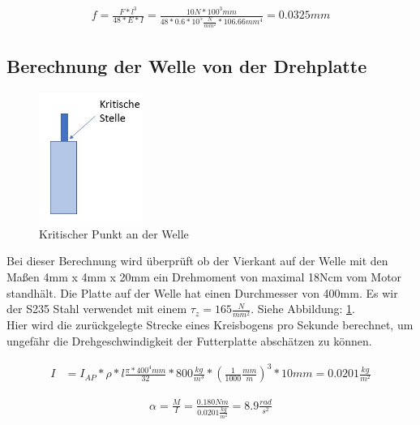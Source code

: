 \begin{align*}
f=\frac{ F*l^{ 3 } }{ 48*E*I} = \frac{10N*100^{3}mm}{48*0.6*10^{5}\frac{N}{mm^{2}}*106.66mm^{4}} = 0.0325mm
\end{align*}
\newpage
\subsection{Berechnung der Welle von der Drehplatte}

\begin{figure}
\vspace{-80pt}
  \begin{center}
    \includegraphics[width=0.3\textwidth]{Bilder/Powerpoint/Torsionsmoment}
  \end{center}
  \caption{Kritischer Punkt an der Welle}
  \label{Torsionsmoment}
  \vspace{-20pt}
\end{figure}

Bei dieser Berechnung wird überprüft ob der Vierkant auf der Welle mit den Maßen 4mm x 4mm x 20mm ein Drehmoment von maximal 18Ncm vom Motor standhält. Die Platte auf der Welle hat einen Durchmesser von 400mm. Es wir der S235 Stahl verwendet mit einem $\tau_z=165\frac{N}{mm^{2}}$. Siehe Abbildung: \ref{Torsionsmoment}.\\

Hier wird die zurückgelegte Strecke eines Kreisbogens pro Sekunde berechnet, um ungefähr die Drehgeschwindigkeit der Futterplatte abschätzen zu können.

\begin{align*}
I & = I_{ AP }*\rho*l\frac{ \pi*400^{4}mm }{32}*800\frac{ kg }{ m^{3} }*(\frac{ 1 }{ 1000}\frac{ mm }{ m })^{3}*10mm  = 0.0201\frac{kg}{m^{2}}
\end{align*}

\begin{align*}
\alpha = \frac{ M }{ I }=\frac{ 0.180Nm }{ 0.0201\frac{kg}{m^{2}} } = 8.9 \frac{ rad }{ s^{2} }
\end{align*}

